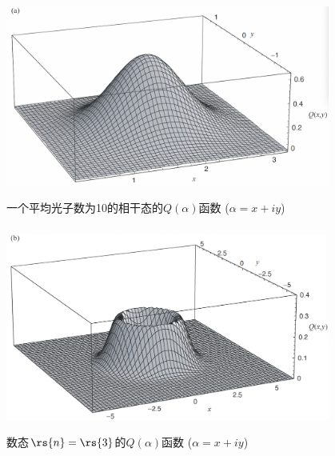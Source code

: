   \begin{frame} 
  \frametitle{}
       \begin{center}
         \includegraphics[width=0.8\textwidth]{figs/2022-06-16-12-43-48.png}
       \end{center}
       一个平均光子数为10的相干态的$Q(\alpha)$函数 ($\alpha=x+iy$)
  \end{frame}

  \begin{frame} 
    \frametitle{}
         \begin{center}
           \includegraphics[width=0.8\textwidth]{figs/2022-06-16-12-48-42.png}
         \end{center}
         数态$\rs{n}=\rs{3}$的$Q(\alpha)$函数 ($\alpha=x+iy$)
    \end{frame}

